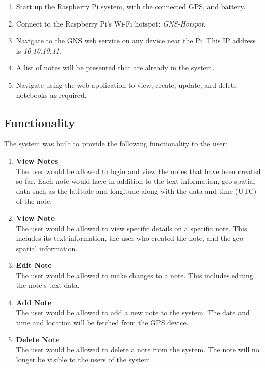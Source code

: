 \begin{enumerate}
	\item Start up the Raspberry Pi system, with the connected GPS, and battery.
	\item Connect to the Raspberry Pi's Wi-Fi hotspot: \textit{GNS-Hotspot}.
	\item Navigate to the GNS web service on any device near the Pi. This IP address is \textit{10.10.10.11}.
	\item A list of notes will be presented that are already in the system.
	\item Navigate using the web application to view, create, update, and delete notebooks as required.
\end{enumerate}

\subsection{Functionality}
The system was built to provide the following functionality to the user:\\

\begin{enumerate}
	\item \textbf{View Notes}\\
	The user would be allowed to login and view the notes that have been created so far. Each note would have in addition to the text information, geo-spatial data such as the latitude and longitude along with the data and time (UTC) of the note.
	
	\item \textbf{View Note}\\
	The user would be allowed to view specific details on a specific note. This includes its text information, the user who created the note, and the geo-spatial information.
	
	\item \textbf{Edit Note}\\
	The user would be allowed to make changes to a note. This includes editing the note's text data.
	
	\item \textbf{Add Note}\\
	The user would be allowed to add a new note to the system. The date and time and location will be fetched from the GPS device.
	
	\item \textbf{Delete Note}\\
	The user would be allowed to delete a note from the system. The note will no longer be visible to the users of the system.
	
\end{enumerate}
